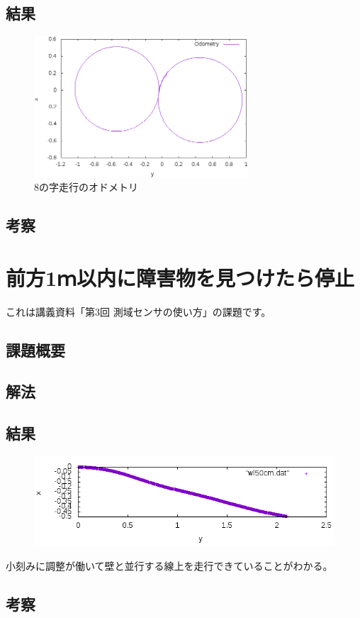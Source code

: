 \documentclass[main]{subfiles}
\begin{document}
\section{結果}
\begin{figure}[H]
	\centering
	\includegraphics[width=8cm]{img/eight.png}
	\caption{8の字走行のオドメトリ}
\end{figure}

\section{考察}


\chapter{前方1ｍ以内に障害物を見つけたら停止}

これは講義資料「第3回 測域センサの使い方」の課題です。

\section{課題概要}
\section{解法}

\section{結果}
\begin{figure}[H]
	\centering
	\includegraphics[width=15cm]{img/wl50cm.png}
\end{figure}
小刻みに調整が働いて壁と並行する線上を走行できていることがわかる。

\section{考察}
\end{document}
